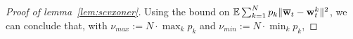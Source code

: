 \begin{proof}[Proof of lemma~\ref{lem:scvxoner}]
\begin{comment}
	& \leq2\sum_{k}p_{k}\|\vg_{t-1,k}-\nabla F_{k}(\vw_{t-1}^{k})\|^{2}+2\sum_{k}p_{k}\|\nabla F_{k}(\vw_{t-1}^{k})\|^{2}\\
	& \leq2\sum_{k}p_{k}\sigma_{k}^{2}+2\sum_{k}p_{k}\|\nabla F_{k}(\vw_{t-1}^{k})-\nabla F_{k}(\ov{w}_{t-1})+\nabla F_{k}(\ov{w}_{t-1})\|^{2}\\
	& \leq2\sum_{k}p_{k}\sigma_{k}^{2}+4\sum_{k}p_{k}\left(\|\nabla F_{k}(\vw_{t-1}^{k})-\nabla F_{k}(\ov{w}_{t-1})\|^{2}+\|\nabla F_{k}(\ov{w}_{t-1})\|^{2}\right)\\
	& \leq2\sigma^{2}+4\sum_{k}p_{k}\left(L^{2}\|\ov{w}_{t-1}-\vw_{t-1}^{k}\|^{2}+\|\nabla F_{k}(\ov{w}_{t-1})\|^{2}\right)
	\end{align*}
	so that 
	\begin{align*}
	\sum_{k=1}^{N}p_{k}\|\ov{w}_{t}-\vw_{t}^{k}\|^{2} & \leq2(1+4L^{2}\alpha_{t-1}^{2})\sum_{k=1}^{N}p_{k}\|\ov{w}_{t-1}-\vw_{t-1}^{k}\|^{2}+4\sigma^{2}\alpha_{t-1}^{2}+8\alpha_{t-1}^{2}\sum_{k}p_{k}\|\nabla F_{k}(\ov{w}_{t-1})\|^{2}
	\end{align*}
	and taking expectation, we have 
	\begin{align*}
	\mathbb{E}\sum_{k=1}^{N}p_{k}\|\ov{w}_{t}-\vw_{t}^{k}\|^{2} & \leq2(1+4L^{2}\alpha_{t-1}^{2})\mathbb{E}\sum_{k=1}^{N}p_{k}\|\ov{w}_{t-1}-\vw_{t-1}^{k}\|^{2}+4\alpha_{t-1}^{2}(\sigma^{2}+2G^{2})
	\end{align*}
	Using this recusive relation at most $E$ times to arrive at a communication
	round and that $\alpha_{t}L\leq1/8$ for all $t$, we have 
	\begin{align*}
	\mathbb{E}\sum_{k=1}^{N}p_{k}\|\ov{w}_{t}-\vw_{t}^{k}\|^{2}\leq E\frac{1}{L^{2}}(\sigma^{2}+2G^{2})
	\end{align*}
	which gives 
	\end{comment}
	
	
	Using the bound on $\mathbb{E}\sum_{k=1}^{N}p_{k}\|{\overline{\mathbf{w}}}_{t}-{\mathbf{w}}_{t}^{k}\|^{2}$,
	we can conclude that, with $\nu_{max}:=N\cdot\max_{k}p_{k}$ and $\nu_{min}:=N\cdot\min_{k}p_{k}$, 
	

\end{proof}

